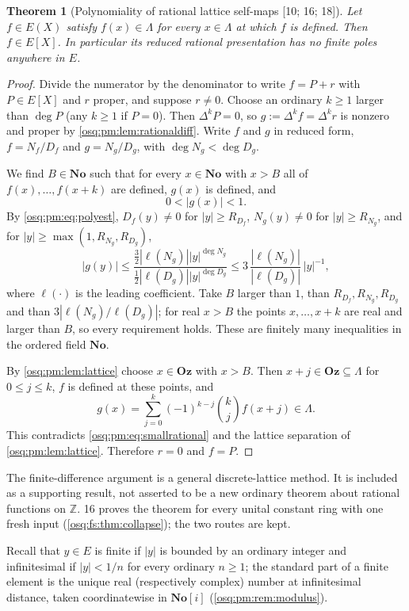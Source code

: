 \documentclass[11pt,letterpaper]{article}
\numberwithin{equation}{section}
\newtheorem{theorem}{Theorem}[section]
\theoremstyle{definition}
\theoremstyle{remark}
\theoremstyle{plain}
\newcommand{\No}{\mathbf{No}}
\newcommand{\Oz}{\mathbf{Oz}}
\newcommand{\SC}{\No[i]}
\newcommand{\Z}{\mathbb Z}
\newcommand{\src}[1]{\textup{\textsf{[#1]}}}
\begin{document}
\begin{theorem}[Polynomiality of rational lattice self-maps \src{10; 16; 18}]
\label{osq:pm:thm:rational}
Let $f\in E(X)$ satisfy $f(x)\in\Lambda$ for every $x\in\Lambda$ at which $f$ is defined.
Then $f\in E[X]$. In particular its reduced rational presentation has no finite poles
anywhere in $E$.
\end{theorem}
\begin{proof}
Divide the numerator by the denominator to write $f=P+r$ with $P\in E[X]$ and $r$ proper,
and suppose $r\ne0$. Choose an ordinary $k\ge1$ larger than $\deg P$ (any $k\ge1$ if
$P=0$). Then $\Delta^kP=0$, so $g:=\Delta^kf=\Delta^kr$ is nonzero and proper by
\cref{osq:pm:lem:rationaldiff}. Write $f$ and $g$ in reduced form, $f=N_f/D_f$ and
$g=N_g/D_g$, with $\deg N_g<\deg D_g$.

We find $B\in\No$ such that for every $x\in\No$ with $x>B$ all of $f(x),\dots,f(x+k)$ are
defined, $g(x)$ is defined, and
\begin{equation}\label{osq:pm:eq:smallrational}
 0<|g(x)|<1 .
\end{equation}
By \eqref{osq:pm:eq:polyest}, $D_f(y)\ne0$ for $|y|\ge R_{D_f}$, $N_g(y)\ne0$ for
$|y|\ge R_{N_g}$, and for $|y|\ge\max(1,R_{N_g},R_{D_g})$,
\[
 |g(y)|\le\frac{\frac32|\ell(N_g)||y|^{\deg N_g}}{\frac12|\ell(D_g)||y|^{\deg D_g}}
 \le3\,\frac{|\ell(N_g)|}{|\ell(D_g)|}\,|y|^{-1},
\]
where $\ell(\cdot)$ is the leading coefficient. Take $B$ larger than $1$, than
$R_{D_f},R_{N_g},R_{D_g}$ and than $3|\ell(N_g)/\ell(D_g)|$; for real $x>B$ the points
$x,\dots,x+k$ are real and larger than $B$, so every requirement holds. These are finitely
many inequalities in the ordered field $\No$.

By \cref{osq:pm:lem:lattice} choose $x\in\Oz$ with $x>B$. Then $x+j\in\Oz\subseteq\Lambda$
for $0\le j\le k$, $f$ is defined at these points, and
\[
 g(x)=\sum_{j=0}^k(-1)^{k-j}\binom kjf(x+j)\in\Lambda .
\]
This contradicts \eqref{osq:pm:eq:smallrational} and the lattice separation of
\cref{osq:pm:lem:lattice}. Therefore $r=0$ and $f=P$.
\end{proof}

The finite-difference argument is a general discrete-lattice method. It is included as a
supporting result, not asserted to be a new ordinary theorem about rational functions on
$\Z$. 16 proves the theorem for every unital constant ring with one fresh input
(\cref{osq:fs:thm:collapse}); the two routes are kept.

Recall that $y\in E$ is finite if $|y|$ is bounded by an ordinary integer and
infinitesimal if $|y|<1/n$ for every ordinary $n\ge1$; the standard part of a finite
element is the unique real (respectively complex) number at infinitesimal distance, taken
coordinatewise in $\SC$ (\cref{osq:pm:rem:modulus}).
\end{document}
